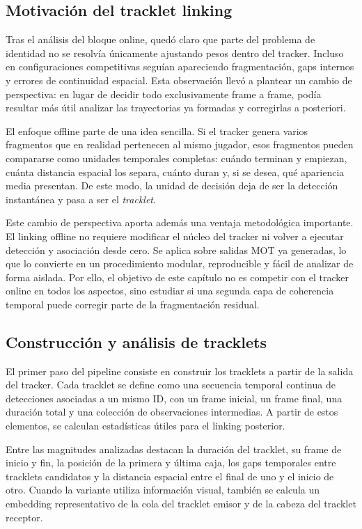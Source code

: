 \documentclass[../MAIN.tex]{subfiles}
\begin{document}
	\subsection{Motivación del tracklet linking}
	
	Tras el análisis del bloque online, quedó claro que parte del problema de identidad no se resolvía únicamente ajustando pesos dentro del tracker. Incluso en configuraciones competitivas seguían apareciendo fragmentación, gaps internos y errores de continuidad espacial. Esta observación llevó a plantear un cambio de perspectiva: en lugar de decidir todo exclusivamente frame a frame, podía resultar más útil analizar las trayectorias ya formadas y corregirlas a posteriori.
	
	El enfoque offline parte de una idea sencilla. Si el tracker genera varios fragmentos que en realidad pertenecen al mismo jugador, esos fragmentos pueden compararse como unidades temporales completas: cuándo terminan y empiezan, cuánta distancia espacial los separa, cuánto duran y, si se desea, qué apariencia media presentan. De este modo, la unidad de decisión deja de ser la detección instantánea y pasa a ser el \textit{tracklet}.
	
	Este cambio de perspectiva aporta además una ventaja metodológica importante. El linking offline no requiere modificar el núcleo del tracker ni volver a ejecutar detección y asociación desde cero. Se aplica sobre salidas MOT ya generadas, lo que lo convierte en un procedimiento modular, reproducible y fácil de analizar de forma aislada. Por ello, el objetivo de este capítulo no es competir con el tracker online en todos los aspectos, sino estudiar si una segunda capa de coherencia temporal puede corregir parte de la fragmentación residual.
	
	\subsection{Construcción y análisis de tracklets}
	
	El primer paso del pipeline consiste en construir los tracklets a partir de la salida del tracker. Cada tracklet se define como una secuencia temporal continua de detecciones asociadas a un mismo ID, con un frame inicial, un frame final, una duración total y una colección de observaciones intermedias. A partir de estos elementos, se calculan estadísticas útiles para el linking posterior.
	
	Entre las magnitudes analizadas destacan la duración del tracklet, su frame de inicio y fin, la posición de la primera y última caja, los gaps temporales entre tracklets candidatos y la distancia espacial entre el final de uno y el inicio de otro. Cuando la variante utiliza información visual, también se calcula un embedding representativo de la cola del tracklet emisor y de la cabeza del tracklet receptor.
	
\end{document}
